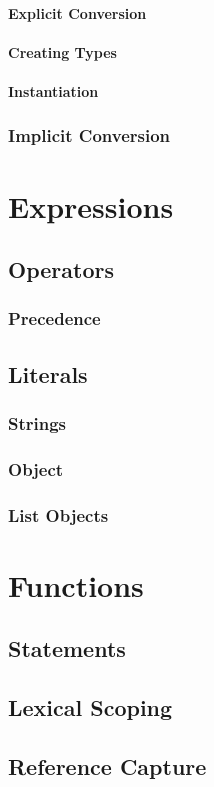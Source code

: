 \documentclass[12pt,letterpaper]{report}
\begin{document}
\subsubsection{Explicit Conversion}
\subsubsection{Creating Types}
\subsubsection{Instantiation}
\subsection{Implicit Conversion}
\chapter{Expressions}
\section{Operators}
\subsection{Precedence}
\section{Literals}
\subsection{Strings}
\subsection{Object}
\subsection{List Objects}
\chapter{Functions}
\section{Statements}
\section{Lexical Scoping}
\section{Reference Capture}
\end{document}
